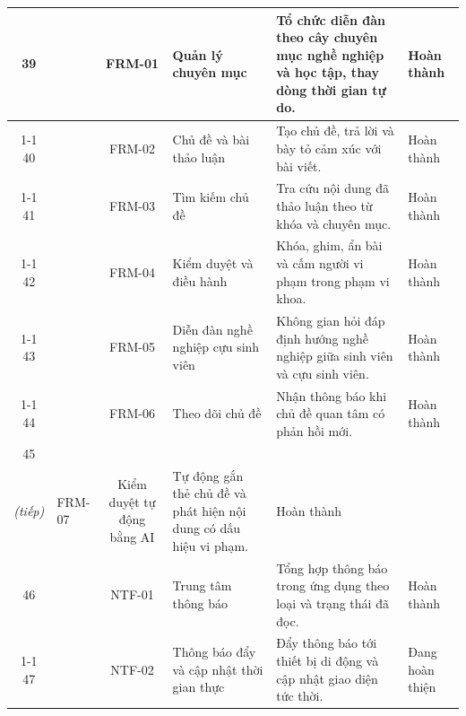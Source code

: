 \documentclass[12pt,a4paper,oneside]{report}
\begin{document}
\begin{landscape}
\begin{longtable}{|c|>{\raggedright\arraybackslash}p{3.1cm}|c|>{\raggedright\arraybackslash}p{4.6cm}|>{\raggedright\arraybackslash}p{8.4cm}|>{\raggedright\arraybackslash}p{2.4cm}|}
\hline
\cellcolor{oldrow}39 & \cellcolor{oldrow} & \cellcolor{oldrow}FRM-01 & \cellcolor{oldrow}Quản lý chuyên mục & \cellcolor{oldrow}Tổ chức diễn đàn theo cây chuyên mục nghề nghiệp và học tập, thay dòng thời gian tự do. & \cellcolor{oldrow}Hoàn thành \\
\cline{1-1}\cline{3-6}
\cellcolor{oldrow}40 & \cellcolor{oldrow} & \cellcolor{oldrow}FRM-02 & \cellcolor{oldrow}Chủ đề và bài thảo luận & \cellcolor{oldrow}Tạo chủ đề, trả lời và bày tỏ cảm xúc với bài viết. & \cellcolor{oldrow}Hoàn thành \\
\cline{1-1}\cline{3-6}
\cellcolor{oldrow}41 & \cellcolor{oldrow} & \cellcolor{oldrow}FRM-03 & \cellcolor{oldrow}Tìm kiếm chủ đề & \cellcolor{oldrow}Tra cứu nội dung đã thảo luận theo từ khóa và chuyên mục. & \cellcolor{oldrow}Hoàn thành \\
\cline{1-1}\cline{3-6}
\cellcolor{oldrow}42 & \cellcolor{oldrow} & \cellcolor{oldrow}FRM-04 & \cellcolor{oldrow}Kiểm duyệt và điều hành & \cellcolor{oldrow}Khóa, ghim, ẩn bài và cấm người vi phạm trong phạm vi khoa. & \cellcolor{oldrow}Hoàn thành \\
\cline{1-1}\cline{3-6}
\cellcolor{oldrow}43 & \cellcolor{oldrow} & \cellcolor{oldrow}FRM-05 & \cellcolor{oldrow}Diễn đàn nghề nghiệp cựu sinh viên & \cellcolor{oldrow}Không gian hỏi đáp định hướng nghề nghiệp giữa sinh viên và cựu sinh viên. & \cellcolor{oldrow}Hoàn thành \\
\cline{1-1}\cline{3-6}
\cellcolor{oldrow}44 & \multirow{-6}{2.4cm}{\cellcolor{oldrow}\textbf{Diễn đàn}} & \cellcolor{oldrow}FRM-06 & \cellcolor{oldrow}Theo dõi chủ đề & \cellcolor{oldrow}Nhận thông báo khi chủ đề quan tâm có phản hồi mới. & \cellcolor{oldrow}Hoàn thành \\
\hline
\cellcolor{oldrow}45 & \multirow{-1}{2.4cm}{\cellcolor{oldrow}\textbf{Diễn đàn\\\textit{(tiếp)}}} & \cellcolor{oldrow}FRM-07 & \cellcolor{oldrow}Kiểm duyệt tự động bằng AI & \cellcolor{oldrow}Tự động gắn thẻ chủ đề và phát hiện nội dung có dấu hiệu vi phạm. & \cellcolor{oldrow}Hoàn thành \\
\hline
\cellcolor{oldrow}46 & \cellcolor{oldrow} & \cellcolor{oldrow}NTF-01 & \cellcolor{oldrow}Trung tâm thông báo & \cellcolor{oldrow}Tổng hợp thông báo trong ứng dụng theo loại và trạng thái đã đọc. & \cellcolor{oldrow}Hoàn thành \\
\cline{1-1}\cline{3-6}
\cellcolor{oldrow}47 & \cellcolor{oldrow} & \cellcolor{oldrow}NTF-02 & \cellcolor{oldrow}Thông báo đẩy và cập nhật thời gian thực & \cellcolor{oldrow}Đẩy thông báo tới thiết bị di động và cập nhật giao diện tức thời. & \cellcolor{oldrow}Đang hoàn thiện \\

\end{longtable}
\end{landscape}
\end{document}
